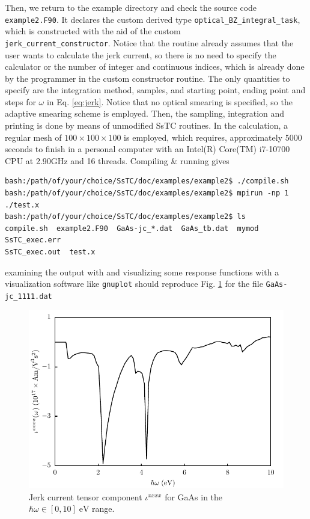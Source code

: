 \documentclass[10pt,a4paper]{article}
\begin{document}
Then, we return to the example directory and check the source code \verb|example2.F90|. It declares the custom derived type \verb|optical_BZ_integral_task|, which is constructed with the aid of the custom \\ \verb|jerk_current_constructor|. Notice that the routine already assumes that the user wants to calculate the jerk current, so there is no need to specify the calculator or the number of integer and continuous indices, which is already done by the programmer in the custom constructor routine. The only quantities to specify are the integration method, samples, and starting point, ending point and steps for $\omega$ in Eq. \eqref{eq:jerk}. Notice that no optical smearing is specified, so the adaptive smearing scheme \cite{yatesSpectralFermiSurface2007} is employed. Then, the sampling, integration and printing is done by means of unmodified SsTC routines. In the calculation, a regular mesh of $100\times 100 \times 100$ is employed, which requires, approximately $5000$ seconds to finish in a personal computer with an Intel(R) Core(TM) i7-10700 CPU at 2.90GHz and 16 threads. Compiling \& running gives
\begin{codebox}{}
\begin{verbatim}
bash:/path/of/your/choice/SsTC/doc/examples/example2$ ./compile.sh
bash:/path/of/your/choice/SsTC/doc/examples/example2$ mpirun -np 1 ./test.x
bash:/path/of/your/choice/SsTC/doc/examples/example2$ ls
compile.sh  example2.F90  GaAs-jc_*.dat  GaAs_tb.dat  mymod  SsTC_exec.err
SsTC_exec.out  test.x
\end{verbatim}
\end{codebox}
examining the output with and visualizing some response functions with a visualization software like \verb|gnuplot| should reproduce Fig. \ref{fig:GaAs_jc_xxxx} for the file \verb|GaAs-jc_1111.dat|
\begin{figure}
\centering
\includegraphics[width=\columnwidth]{jc/jc_GaAs_xxxx.pdf}
\caption{Jerk current tensor component $\iota^{xxxx}$ for GaAs in the $\hbar\omega\in[0, 10]\;\text{eV}$ range.}
\label{fig:GaAs_jc_xxxx}
\end{figure}
\end{document}
